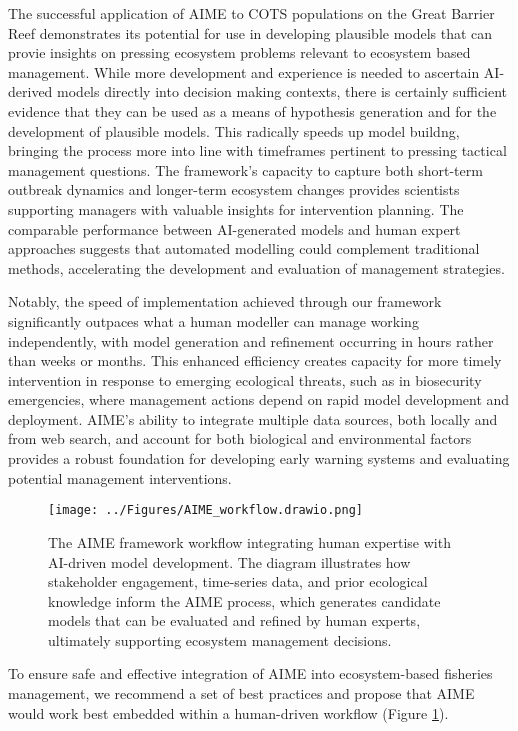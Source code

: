 The successful application of AIME to COTS populations on the Great Barrier Reef demonstrates its potential for use in developing plausible models that can provie insights on pressing ecosystem problems relevant to ecosystem based management. While more development and experience is needed to ascertain AI-derived models directly into decision making contexts, there is certainly sufficient evidence that they can be used as a means of
hypothesis generation and for the development of plausible models. This radically speeds up model buildng, bringing the process more into line with timeframes pertinent to pressing tactical management questions. The framework's capacity to capture both short-term outbreak dynamics and longer-term ecosystem changes provides scientists supporting managers with valuable insights for intervention planning. The comparable performance between AI-generated models and human expert approaches suggests that automated modelling could complement traditional methods, accelerating the development and evaluation of management strategies.

Notably, the speed of implementation achieved through our framework significantly outpaces what a human modeller can manage working independently, with model generation and refinement occurring in hours rather than weeks or months. This enhanced efficiency creates capacity for more timely intervention in response to emerging ecological threats, such as in biosecurity emergencies, where management actions depend on rapid model development and deployment. AIME's ability to integrate multiple data sources, both locally and from web search, and account for both biological and environmental factors provides a robust foundation for developing early warning systems and evaluating potential management interventions.\

\begin{figure}[htbp]
    \centering
    \texttt{[image: ../Figures/AIME\_workflow.drawio.png]}
    \caption{The AIME framework workflow integrating human expertise with AI-driven model development. The diagram illustrates how stakeholder engagement, time-series data, and prior ecological knowledge inform the AIME process, which generates candidate models that can be evaluated and refined by human experts, ultimately supporting ecosystem management decisions.}
    \label{fig:aime_workflow}
\end{figure}


To ensure safe and effective integration of AIME into ecosystem-based fisheries management, we recommend a set of best practices and propose that AIME would work best embedded within a human-driven workflow (Figure \ref{fig:aime_workflow}). 

